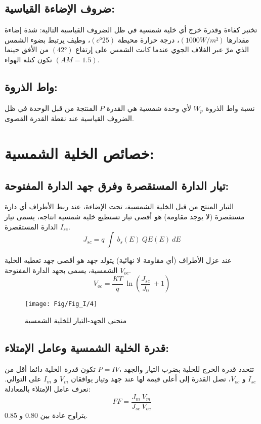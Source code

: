 \subsection{ضروف الإضاءة القياسية:}
تختبر كفاءة وقدرة خرج أي خلية شمسية في ظل الضروف القياسية التالية: شدة إضاءة مقدارها $ (1000W/m²) $، درجة حرارة محيطة $ (c°25) $، وطيف يرتبط بضوء الشمس الذي مرّ عبر الغلاف الجوي عندما كانت الشمس على إرتفاع $  (42°)  $ من الأفق حينما تكون كتلة الهواء $ (AM=1.5) $.
\subsection{واط الذروة:}
نسبة واط الذروة $ W_p $ لأي وحدة شمسية هي القدرة $ P $ المنتجة من قبل الوحدة في ظل الضروف القياسية عند نقطة القدرة القصوى.

\section{خصائص الخلية الشمسية:}
\subsection{تيار الدارة المستقصرة وفرق جهد الدارة المفتوحة:}
التيار المنتج من قبل الخلية الشمسية، تحت الإضاءة، عند ربط الأطراف أي دارة مستقصرة (لا يوجد مقاومة) ‫هو‬ ‫أقصى‬ ‫تيار‬ ‫تستطيع‬ ‫خلية‬ ‫شمسية‬ ‫انتاجه‬، يسمى تيار الدارة المستقصرة $ I_{sc} $.
\begin{equation}
	J_{sc}=q\  \int\ b_s  \left( E \right)\ QE \left( E \right)\ dE
	\label{معادلة 1}
\end{equation}

عند عزل الأطراف (أي مقاومة لا نهائية) يتولد جهد هو أقصى جهد تعطيه الخلية الشمسية، يسمى بجهد الدارة المفتوحة $ V_{oc} $.
\begin{equation}
	V_{oc}= \frac{KT}{q}\ \ln \left( \frac{J_{sc}}{J_0}\ +1 \right)
\end{equation}

\begin{figure}[h!]
	\centering
	\texttt{[image: Fig/Fig\_I/4]}
	\caption{منحنى الجهد-التيار للخلية الشمسية}
	\label{fig:4}
\end{figure}
\FloatBarrier
\subsection{قدرة الخلية الشمسية وعامل الإمتلاء:} 
تتحدد قدرة الخرج للخلية بضرب التيار والجهد $ P=IV، $ تكون قدرة الخلية دائما أقل من $ I_{sc} $ و $ V_{oc} $، تصل القدرة إلى أعلى قيمة لها عند جهد وتيار يوافقان $ V_m $ و $ I_m $ على التوالي.
نعرف عامل الإمتلاء بالمعادلة:
\begin{equation}
	FF=\frac{J_m\ V_m}{J_{sc}\ V_{oc}}
\end{equation}
يتراوح عادة بين 0.80 و 0.85.
